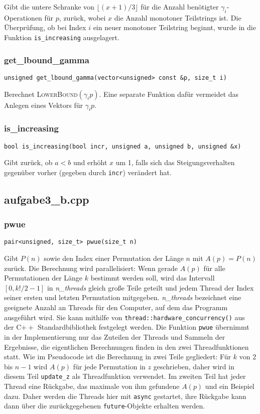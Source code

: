 \documentclass[a4paper, 10pt, ngerman]{article}
\begin{document}
\noindent Gibt die untere Schranke von $\lfloor (x + 1)/ 3 \rfloor$ für die Anzahl benötigter $\gamma_i$-Operationen für $p$, zurück, wobei $x$ die Anzahl monotoner Teilstrings ist. Die Überprüfung, ob bei Index $i$ ein neuer monotoner Teilstring beginnt, wurde in die Funktion \verb|is_increasing| ausgelagert.

\subsubsection{get\_lbound\_gamma}
\verb|unsigned get_lbound_gamma(vector<unsigned> const &p, size_t i)|
\medskip

\noindent Berechnet \textsc{LowerBound}$(\gamma_i p)$. Eine separate Funktion dafür vermeidet das Anlegen eines Vektors für $\gamma_i p$.

\subsubsection{is\_increasing}
\verb|bool is_increasing(bool incr, unsigned a, unsigned b, unsigned &x)|
\medskip

\noindent Gibt zurück, ob $a < b$ und erhöht $x$ um 1, falls sich das Steigungsverhalten gegenüber vorher (gegeben durch \verb|incr|) verändert hat.

\subsection{aufgabe3\_b.cpp}

\subsubsection{pwue}
\verb|pair<unsigned, size_t> pwue(size_t n)|
\medskip

\noindent Gibt $P(n)$ sowie den Index einer Permutation der Länge $n$ mit $A(p) = P(n)$ zurück. Die Berechnung wird parallelisiert: Wenn gerade $A(p)$ für alle Permutationen der Länge $k$ bestimmt werden soll, wird das Intervall $[0, k!/2 - 1]$ in \emph{n\_threads} gleich große Teile geteilt und jedem Thread der Index seiner ersten und letzten Permutation mitgegeben. \emph{n\_threads} bezeichnet eine geeignete Anzahl an Threads für den Computer, auf dem das Programm ausgeführt wird. Sie kann mithilfe von \verb|thread::hardware_concurrency()| aus der C$++$ Standardbibliothek festgelegt werden. Die Funktion \verb|pwue| übernimmt in der Implementierung nur das Zuteilen der Threads und Sammeln der Ergebnisse, die eigentlichen Berechnungen finden in den zwei Threadfunktionen statt. Wie im Pseudocode ist die Berechnung in zwei Teile gegliedert: Für $k$ von 2 bis $n - 1$ wird $A(p)$ für jede Permutation in $z$ geschrieben, daher wird in diesem Teil \verb|update_z| als Threadfunktion verwendet. Im zweiten Teil hat jeder Thread eine Rückgabe, das maximale von ihm gefundene $A(p)$ und ein Beispiel dazu. Daher werden die Threads hier mit \verb|async| gestartet, ihre Rückgabe kann dann über die zurückgegebenen \verb|future|-Objekte erhalten werden.
\end{document}
